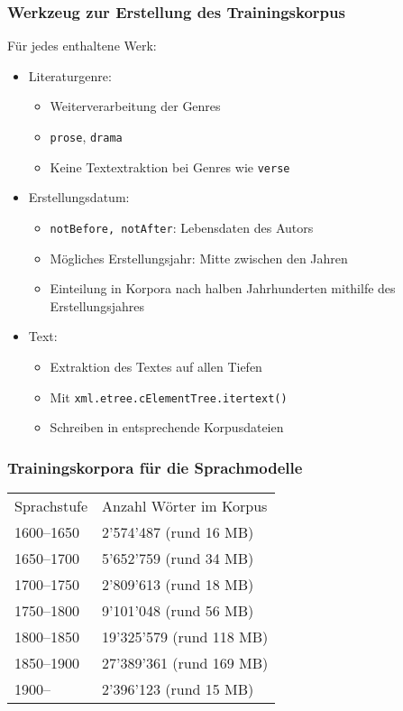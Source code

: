 \documentclass[t]{beamer} %
\begin{document}
\begin{frame}
  \frametitle{Werkzeug zur Erstellung des Trainingskorpus}
  Für jedes enthaltene Werk:
  
  \begin{itemize}
  \item Literaturgenre:
    \begin{itemize}
    \item Weiterverarbeitung der Genres \item \texttt{prose}, \texttt{drama} 
    \item Keine Textextraktion bei Genres wie \texttt{verse}
    \end{itemize}
    \vspace*{1ex}
    \pause

  \item Erstellungsdatum:
    \begin{itemize}
    \item \texttt{notBefore, notAfter}: Lebensdaten des Autors
    \item Mögliches Erstellungsjahr: Mitte zwischen den Jahren 
    \item Einteilung in Korpora nach halben Jahrhunderten mithilfe des Erstellungsjahres
    \end{itemize}
    \vspace*{1ex}
    \pause
    
  \item Text:
    \begin{itemize}
    \item Extraktion des Textes auf allen Tiefen
    \item Mit \texttt{xml.etree.cElementTree.itertext()}
    \item Schreiben in entsprechende Korpusdateien
    \end{itemize}
  \end{itemize}
\end{frame}

\begin{frame}
  \frametitle{Trainingskorpora für die Sprachmodelle}
  \begin{tabular}{ll}
  Sprachstufe & Anzahl Wörter im Korpus
  \vspace*{1ex}\\
  1600--1650 & 2'574'487 (rund 16 MB)\\
  1650--1700 & 5'652'759 (rund 34 MB)\\
  1700--1750 & 2'809'613 (rund 18 MB)\\
  1750--1800 & 9'101'048 (rund 56 MB)\\
  1800--1850 & 19'325'579 (rund 118 MB)\\
  1850--1900 & 27'389'361 (rund 169 MB)\\
  1900--     & 2'396'123 (rund 15 MB)
  
  \end{tabular}
\end{frame}
\end{document}
